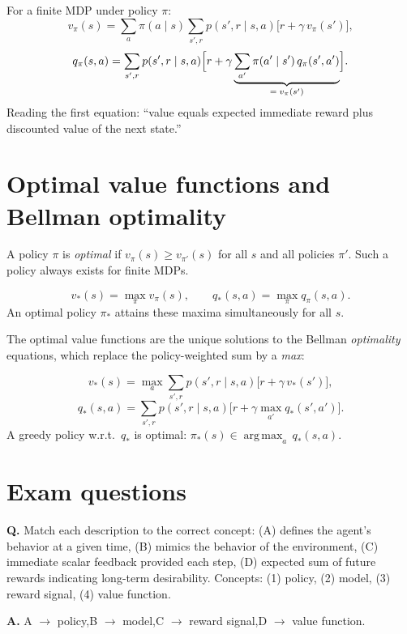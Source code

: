 \documentclass[11pt, oneside]{book}
\newcommand{\argmax}{\operatorname*{arg\,max}}
\newcommand{\vpi}{v_{\pi}}              %
\newcommand{\qpi}{q_{\pi}}             %
\newcommand{\vstar}{v_{*}}             %
\newcommand{\qstar}{q_{*}}            %
\begin{document}
\begin{thmbox}[title={Bellman Expectation Equations}]
For a finite MDP under policy $\pi$:
\[
  \vpi(s)
  = \sum_{a}\pi(a\mid s)\sum_{s',r} p(s',r\mid s,a)\bigl[r + \gamma\,\vpi(s')\bigr],
\]
\[
  \qpi(s,a)
  = \sum_{s',r} p(s',r\mid s,a)
    \Bigl[r + \gamma\underbrace{\sum_{a'}\pi(a'\mid s')\,\qpi(s',a')}_{=\;\vpi(s')}\Bigr].
\]
Reading the first equation: ``value equals expected immediate reward plus
discounted value of the next state.''
\end{thmbox}

\section{Optimal value functions and Bellman optimality}

A policy $\pi$ is \emph{optimal} if $\vpi(s) \ge v_{\pi'}(s)$ for all $s$
and all policies $\pi'$. Such a policy always exists for finite MDPs.

\begin{defbox}[title={Optimal Value Functions}]
\[
  \vstar(s) = \max_{\pi} \vpi(s),
  \qquad
  \qstar(s,a) = \max_{\pi} \qpi(s,a).
\]
An optimal policy $\pi_*$ attains these maxima simultaneously for all $s$.
\end{defbox}

The optimal value functions are the unique solutions to the Bellman
\emph{optimality} equations, which replace the policy-weighted sum by a
\emph{max}:

\begin{thmbox}[title={Bellman Optimality Equations}]
\[
  \vstar(s) = \max_{a}\sum_{s',r} p(s',r\mid s,a)\bigl[r + \gamma\,\vstar(s')\bigr],
\]
\[
  \qstar(s,a) = \sum_{s',r} p(s',r\mid s,a)\bigl[r + \gamma\max_{a'}\qstar(s',a')\bigr].
\]
A greedy policy w.r.t.\ $\qstar$ is optimal:
$\pi_*(s) \in \argmax_a\,\qstar(s,a)$.
\end{thmbox}

\section{Exam questions}

\begin{exbox}[title={Exam: Matching Concepts}]
\textbf{Q.} Match each description to the correct concept:
(A) defines the agent's behavior at a given time,
(B) mimics the behavior of the environment,
(C) immediate scalar feedback provided each step,
(D) expected sum of future rewards indicating long-term desirability.
Concepts: (1) policy, (2) model, (3) reward signal, (4) value function.

\medskip
\textbf{A.} A $\to$ policy,\quad B $\to$ model,\quad C $\to$ reward signal,\quad D $\to$ value function.
\end{exbox}
\end{document}
